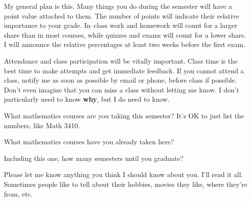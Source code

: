   My general plan is this.  Many things you do during the semester will have a point value attached to them.  The number of points will indicate their relative importance to your grade.  In--class work and homework will count for a larger share than in most courses, while quizzes and exams will count for a lower share.  I will announce the relative percentages at least two weeks before the first exam.


\vspace*{1in}

 Attendance and class participation will be vitally important.
Class time is the best time to make attempts and get immediate feedback.
If you cannot attend a class, notify me as soon as possible by email or phone, before class if possible.
Don't even imagine that you can miss a class without letting me know.
I don't particularly need to know {\bf why}, but I do need to know.


\blist{0.8in}
\item What mathematics courses are you taking this semester?
It's OK to just list the numbers, like Math 3410.

\item What mathematics courses have you already taken here?

\item Including this one, how many semesters until you graduate?

\item Please let me know anything you think I should know about you.  I'll read it all.  Sometimes people like to tell about their hobbies, movies they like, where they're from, etc.

\elist

\vfill          %
